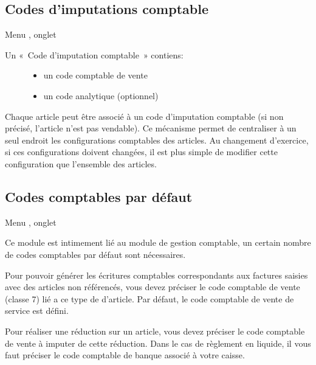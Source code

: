 \documentclass[a4paper,10pt,oneside,french]{sphinxmanual}
\begin{document}
\subsection{Codes d’imputations comptable}
\label{\detokenize{invoice/configuration:codes-d-imputations-comptable}}
\sphinxAtStartPar
Menu , onglet 
\begin{description}
\item[{Un « Code d’imputation comptable » contiens:}] \leavevmode\begin{itemize}
\item {} 
\sphinxAtStartPar
un code comptable de vente

\item {} 
\sphinxAtStartPar
un code analytique (optionnel)

\end{itemize}

\end{description}

\sphinxAtStartPar
Chaque article peut être associé à un code d’imputation comptable (si non précisé, l’article n’est pas vendable).
Ce mécanisme permet de centraliser à un seul endroit les configurations comptables des articles.
Au changement d’exercice, si ces configurations doivent changées, il est plus simple de modifier cette configuration que l’ensemble des articles.


\subsection{Codes comptables par défaut}
\label{\detokenize{invoice/configuration:codes-comptables-par-defaut}}
\sphinxAtStartPar
Menu , onglet 

\sphinxAtStartPar
Ce module est intimement lié au module de gestion comptable, un certain nombre de codes comptables par défaut sont nécessaires.

\sphinxAtStartPar
Pour pouvoir générer les écritures comptables correspondants aux factures saisies avec des articles non référencés, vous devez préciser le code comptable de vente (classe 7) lié a ce type de d’article. Par défaut, le code comptable de vente de service est défini.

\sphinxAtStartPar
Pour réaliser une réduction sur un article, vous devez préciser le code comptable de vente à imputer de cette réduction.
Dans le cas de règlement en liquide, il vous faut préciser le code comptable de banque associé à votre caisse.
\end{document}
